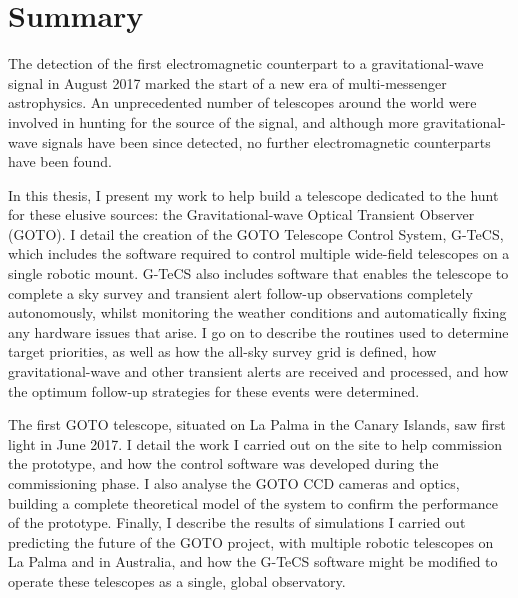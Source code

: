 \chapter*{Summary}

\begin{onehalfspace}

The detection of the first electromagnetic counterpart to a gravitational-wave signal in August 2017 marked the start of a new era of multi-messenger astrophysics. An unprecedented number of telescopes around the world were involved in hunting for the source of the signal, and although more gravitational-wave signals have been since detected, no further electromagnetic counterparts have been found.

\medskip

In this thesis, I present my work to help build a telescope dedicated to the hunt for these elusive sources: the Gravitational-wave Optical Transient Observer (GOTO). I detail the creation of the GOTO Telescope Control System, G-TeCS, which includes the software required to control multiple wide-field telescopes on a single robotic mount. G-TeCS also includes software that enables the telescope to complete a sky survey and transient alert follow-up observations completely autonomously, whilst monitoring the weather conditions and automatically fixing any hardware issues that arise. I go on to describe the routines used to determine target priorities, as well as how the all-sky survey grid is defined, how gravitational-wave and other transient alerts are received and processed, and how the optimum follow-up strategies for these events were determined.

\medskip

The first GOTO telescope, situated on La Palma in the Canary Islands, saw first light in June 2017. I detail the work I carried out on the site to help commission the prototype, and how the control software was developed during the commissioning phase. I also analyse the GOTO CCD cameras and optics, building a complete theoretical model of the system to confirm the performance of the prototype. Finally, I describe the results of simulations I carried out predicting the future of the GOTO project, with multiple robotic telescopes on La Palma and in Australia, and how the G-TeCS software might be modified to operate these telescopes as a single, global observatory.

\end{onehalfspace}

